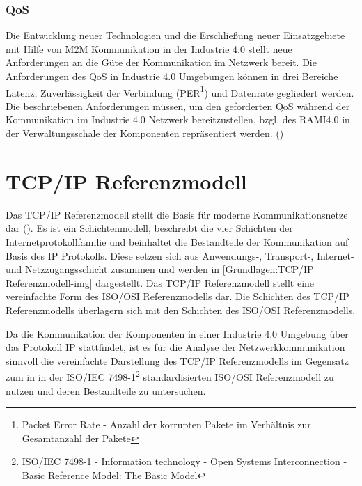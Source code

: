 \subsubsection{\ac{QoS}}
Die Entwicklung neuer Technologien und die Erschließung neuer Einsatzgebiete mit Hilfe von \ac{M2M} Kommunikation in der Industrie 4.0 stellt neue Anforderungen an die Güte der Kommunikation im Netzwerk bereit. Die Anforderungen des \ac{QoS} in Industrie 4.0 Umgebungen können in drei Bereiche Latenz, Zuverlässigkeit der Verbindung (\ac{PER}\footnote{Packet Error Rate - Anzahl der korrupten Pakete im Verhältnis zur Gesamtanzahl der Pakete}) und Datenrate gegliedert werden. Die beschriebenen Anforderungen müssen, um den geforderten \ac{QoS} während der Kommunikation im Industrie 4.0 Netzwerk bereitzustellen, bzgl. des \ac{RAMI4.0} in der Verwaltungsschale der Komponenten repräsentiert werden. (\cite{BMWiNeCon2016})

\section{TCP/IP Referenzmodell}
\label{Grundlagen:TCP/IP Referenzmodell}
Das \ac{TCP}/\ac{IP} Referenzmodell stellt die Basis für moderne Kommunikationsnetze dar (\cite{sichKom2017}). Es ist ein Schichtenmodell, beschreibt die vier Schichten der Internetprotokollfamilie und beinhaltet die Bestandteile der Kommunikation auf Basis des \ac{IP} Protokolls. Diese setzen sich aus Anwendungs-, Transport-, Internet- und Netzzugangsschicht zusammen und werden in \autoref{Grundlagen:TCP/IP Referenzmodell-img} dargestellt. Das \ac{TCP}/\ac{IP} Referenzmodell stellt eine vereinfachte Form des \ac{ISO}/\ac{OSI} Referenzmodells dar. Die Schichten des \ac{TCP}/\ac{IP} Referenzmodells überlagern sich mit den Schichten des \ac{ISO}/\ac{OSI} Referenzmodells.

Da die Kommunikation der Komponenten in einer Industrie 4.0 Umgebung über das Protokoll \ac{IP} stattfindet, ist es für die Analyse der Netzwerkkommunikation sinnvoll die vereinfachte Darstellung des \ac{TCP}/\ac{IP} Referenzmodells im Gegensatz zum in in der \ac{ISO}/\ac{IEC} 7498-1\footnote{ISO/IEC 7498-1 - Information technology - Open Systems Interconnection - Basic Reference Model: The Basic Model} standardisierten \ac{ISO}/\ac{OSI} Referenzmodell zu nutzen und deren Bestandteile zu untersuchen.

